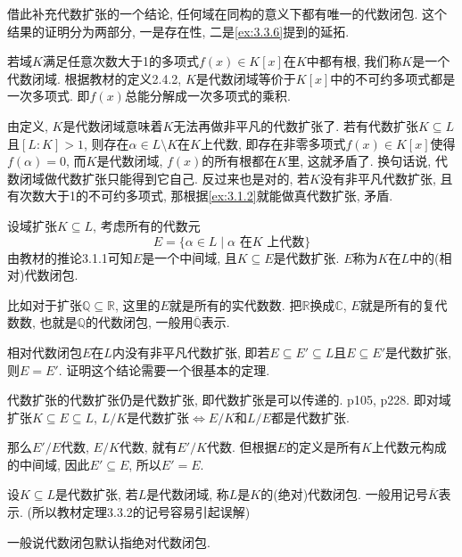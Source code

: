 \begin{remark}
    借此补充代数扩张的一个结论, 任何域在同构的意义下都有唯一的代数闭包. 这个结果的证明分为两部分, 一是存在性, 二是\ref{ex:3.3.6}提到的延拓.

    \begin{defstar}
        若域$K$满足任意次数大于1的多项式$f(x) \in K[x]$在$K$中都有根, 我们称$K$是一个代数闭域. 根据教材的定义2.4.2, $K$是代数闭域等价于$K[x]$中的不可约多项式都是一次多项式. 即$f(x)$总能分解成一次多项式的乘积.
    \end{defstar}
    由定义, $K$是代数闭域意味着$K$无法再做非平凡的代数扩张了. 若有代数扩张$K \subseteq L$且$[L:K] > 1$, 则存在$\alpha \in L \setminus K$在$K$上代数, 即存在非零多项式$f(x) \in K[x]$使得$f(\alpha) = 0$, 而$K$是代数闭域, $f(x)$的所有根都在$K$里, 这就矛盾了. 换句话说, 代数闭域做代数扩张只能得到它自己. 反过来也是对的, 若$K$没有非平凡代数扩张, 且有次数大于1的不可约多项式, 那根据\ref{ex:3.1.2}就能做真代数扩张, 矛盾.

    \begin{defstar}
        设域扩张$K \subseteq L$, 考虑所有的代数元
        \[
            E = \{\alpha \in L \mid \alpha \text{ 在}K \text{ 上代数}\}
        \]
        由教材的推论3.1.1可知$E$是一个中间域, 且$K \subseteq E$是代数扩张. $E$称为$K$在$L$中的(相对)代数闭包.
    \end{defstar}
    比如对于扩张$\mathbb{Q} \subseteq \mathbb{R}$, 这里的$E$就是所有的实代数数. 把$\mathbb{R}$换成$\mathbb{C}$, $E$就是所有的复代数数, 也就是$\mathbb{Q}$的代数闭包, 一般用$\overline{\mathbb{Q}}$表示.

    相对代数闭包$E$在$L$内没有非平凡代数扩张, 即若$E \subseteq E' \subseteq L$且$E \subseteq E'$是代数扩张, 则$E = E'$. 证明这个结论需要一个很基本的定理.

    \begin{thmstar}
        代数扩张的代数扩张仍是代数扩张, 即代数扩张是可以传递的. \cite{2009近世代数引论}p105, \cite{lang2012algebra}p228. 即对域扩张$K \subseteq E \subseteq L$, $L/K$是代数扩张$\iff E/K$和$L/E$都是代数扩张.
    \end{thmstar}

    那么$E'/E$代数, $E/K$代数, 就有$E'/K$代数. 但根据$E$的定义是所有$K$上代数元构成的中间域, 因此$E' \subseteq E$, 所以$E' = E$.

    \begin{defstar}
        设$K \subseteq L$是代数扩张, 若$L$是代数闭域, 称$L$是$K$的(绝对)代数闭包. 一般用记号$\overline{K}$表示. (所以教材定理3.3.2的记号容易引起误解)
    \end{defstar}
    一般说代数闭包默认指绝对代数闭包.


\end{remark}
